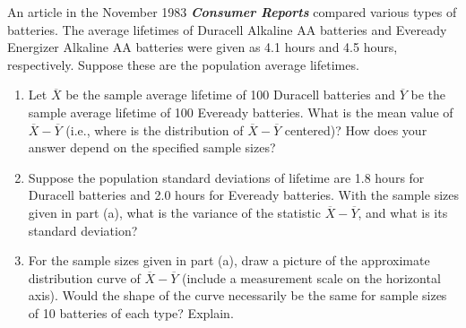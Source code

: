 \documentclass[11pt,letterpaper,boxed]{hmcpset}
\begin{document}
 {



\begin{problem}[9.1.1]
	An article in the November 1983 \textbf{\emph{Consumer Reports}} compared various types of batteries. The average lifetimes of Duracell Alkaline AA batteries and Eveready Energizer Alkaline AA batteries were given as 4.1 hours and 4.5 hours, respectively. Suppose these are the population average lifetimes.
	\begin{enumerate}
		\item
			Let $\overline{X}$ be the sample average lifetime of 100 Duracell batteries and $\overline{Y}$ be the sample average lifetime of 100 Eveready batteries. What is the mean value of $\overline{X} - \overline{Y}$ (i.e., where is the distribution of $\overline{X} - \overline{Y}$ centered)? How does your answer depend on the specified sample sizes?
		\item
			Suppose the population standard deviations of lifetime are 1.8 hours for Duracell batteries and 2.0 hours for Eveready batteries. With the sample sizes given in part (a), what is the variance of the statistic $\overline{X} - \overline{Y}$, and what is its standard deviation?
		\item
			For the sample sizes given in part (a), draw a picture of the approximate distribution curve of $\overline{X} - \overline{Y}$ (include a measurement scale on the horizontal axis). Would the shape of the curve necessarily be the same for sample sizes of 10 batteries of each type? Explain.
	\end{enumerate}
\end{problem}

\begin{solution}
	\vfill
\end{solution}
\newpage


}
\end{document}
